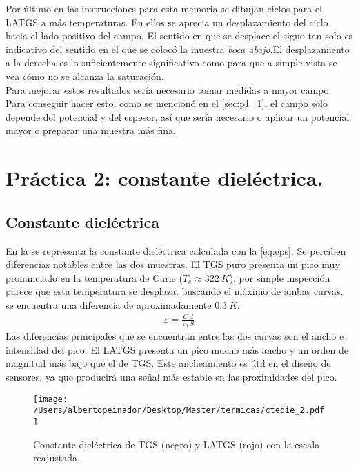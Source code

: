 \documentclass[a4paper, 12pt, spanish]{article}
\begin{document}
\begin{multicols}{2}
Por último en las instrucciones para esta memoria se dibujan ciclos para el LATGS a más temperaturas. En ellos se aprecia un desplazamiento del ciclo hacia el lado positivo del campo. El sentido en que se desplace el signo tan solo es indicativo del sentido en el que se colocó la muestra \textit{boca abajo}.El desplazamiento a la derecha es lo suficientemente significativo como para que  a simple vista se vea cómo no se alcanza la saturación.\\ Para mejorar estos resultados sería necesario tomar medidas a mayor campo. Para conseguir hacer esto, como se mencionó en el \cref{sec:p1_1}, el campo solo depende del potencial y del espesor, así que sería necesario o aplicar un potencial mayor o preparar una muestra más fina.
\section{Práctica 2: constante dieléctrica.}
\subsection*{Constante dieléctrica}
En la  se representa la constante dieléctrica calculada con la \cref{eq:eps}. Se perciben diferencias notables entre las dos muestras. El TGS puro presenta un pico muy pronunciado en la temperatura de Curie ($T_c\approx 322\ K$), por simple inspección parece que esta temperatura se desplaza, buscando el máximo de ambas curvas, se encuentra una diferencia de aproximadamente $0.3\ K$.
\begin{eqnarray}
    \varepsilon = \frac{C\ d}{\varepsilon_0\ S} \label{eq:eps}
\end{eqnarray}
Las diferencias principales que se encuentran entre las dos curvas son el ancho e intensidad del pico. El LATGS presenta un pico mucho más ancho y un orden de magnitud más bajo que el de TGS. Este ancheamiento es útil en el diseño de sensores, ya que producirá una señal más estable en las proximidades del pico.

\begin{figure}[H]
    \centering
    \texttt{[image: /Users/albertopeinador/Desktop/Master/termicas/ctedie\_2.pdf]}
    \caption{Constante dieléctrica de TGS (negro) y LATGS (rojo) con la escala reajustada.}\label{fig:eps}
\end{figure}

\end{multicols}
\end{document}

